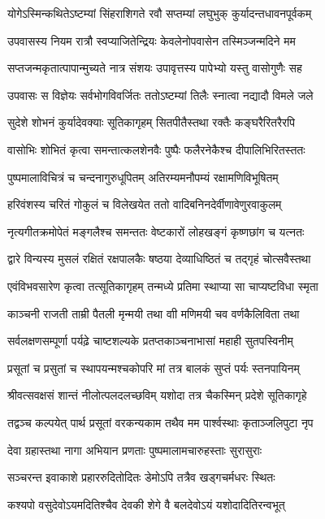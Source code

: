 \twolineshloka
{योगेऽस्मिन्कथितेऽष्टम्यां सिंहराशिगते रवौ}
{सप्तम्यां लघुभुक् कुर्यादन्तधावनपूर्वकम्}%

\twolineshloka
{उपवासस्य नियम रात्रौ स्वप्याजितेन्द्रियः}
{केवलेनोपवासेन तस्मिञ्जन्मदिने मम}%

\twolineshloka
{सप्तजन्मकृतात्पापान्मुच्यते नात्र संशयः}
{उपावृत्तस्य पापेभ्यो यस्तु वासोगुणैः सह}%

\twolineshloka
{उपवासः स विज्ञेयः सर्वभोगविवर्जितः}
{ततोऽष्टम्यां तिलैः स्नात्वा नद्यादौ विमले जले}%

\twolineshloka
{सुदेशे शोभनं कुर्यादेवक्याः सूतिकागृहम्}
{सितपीतैस्तथा रक्तैः कङ्घरैरितरैरपि}%

\twolineshloka
{वासोभिः शोभितं कृत्वा समन्तात्कलशेनवैः}
{पुष्पैः फलैरनेकैश्च दीपालिभिरितस्ततः}%

\twolineshloka
{पुष्पमालाविचित्रं च चन्दनागुरुधूपितम्}
{अतिरम्यमनौपम्यं रक्षामणिविभूषितम्}%

\twolineshloka
{हरिवंशस्य चरितं गोकुलं च विलेखयेत}
{ततो वादिबनिनदेर्वीणावेणुरवाकुलम्}%

\twolineshloka
{नृत्यगीतक्रमोपेतं मङ्गलैश्च समन्ततः}
{वेष्टकारों लोहखङ्गं कृष्णछांग च यत्नतः}%

\twolineshloka
{द्वारे विन्यस्य मुसलं रक्षितं रक्षपालकैः}
{षष्ठया देव्याधिष्ठितं च तद्गृहं चोत्सवैस्तथा}%

\twolineshloka
{एवंविभवसारेण कृत्वा तत्सूतिकागृहम्}
{तन्मध्ये प्रतिमा स्थाप्या सा चाप्यष्टविधा स्मृता}%

\twolineshloka
{काञ्चनी राजती ताम्री पैतली मृन्मयी तथा}
{वाी मणिमयी चव वर्णकैलिविता तथा}%

\twolineshloka
{सर्वलक्षणसम्पूर्णा पर्यढ़े चाष्टशल्यके}
{प्रतप्तकाञ्चनाभासां महाही सुतपस्विनीम्}%

\twolineshloka
{प्रसूतां च प्रसुतां च स्थापयन्मश्चकोपरि}
{मां तत्र बालकं सुप्तं पर्यः स्तनपायिनम्}%

\twolineshloka
{श्रीवत्सवक्षसं शान्तं नीलोत्पलदलच्छविम्}
{यशोदा तत्र चैकस्मिन् प्रदेशे सूतिकागृहे}%

\twolineshloka
{तद्वञ्च कल्पयेत् पार्थ प्रसूतां वरकन्यकाम}
{तथैव मम पार्श्वस्थाः कृताञ्जलिपुटा नृप}%

\twolineshloka
{देवा ग्रहास्तथा नागा अभियान}
{प्रणताः पुष्पमालामचारुहस्ताः सुरासुराः}%

\twolineshloka
{सञ्चरन्त इवाकाशे प्रहाररुदितोदितः}
{डेमोऽपि तत्रैव खड्गचर्मधरः स्थितः}%

\twolineshloka
{कश्यपो वसुदेवोऽयमदितिश्चैव देवकी}
{शेगे वै बलदेवोऽयं यशोदादितिरन्वभूत्}%

